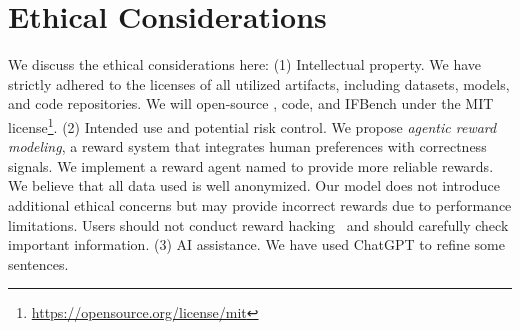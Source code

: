 \section*{Ethical Considerations}
We discuss the ethical considerations here:
(1) Intellectual property. 
We have strictly adhered to the licenses of all utilized artifacts, including datasets, models, and code repositories. We will open-source \ourmethod, code, and IFBench under the MIT license\footnote{\url{https://opensource.org/license/mit}}.
(2) Intended use and potential risk control.
We propose \textit{agentic reward modeling}, a reward system that integrates human preferences with correctness signals. We implement a reward agent named \ourmethod to provide more reliable rewards. We believe that all data used is well anonymized. Our model does not introduce additional ethical concerns but may provide incorrect rewards due to performance limitations. Users should not conduct reward hacking~\citep{skalse2022defining} and should carefully check important information.
(3) AI assistance. 
We have used ChatGPT to refine some sentences.